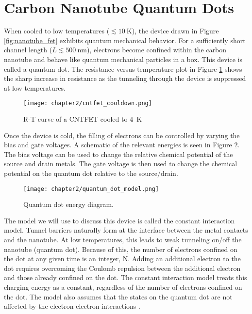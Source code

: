 \section{Carbon Nanotube Quantum Dots}
\label{sec:constant_interaction_model}

When cooled to low temperatures ($\lesssim \SI{10}{\kelvin}$), the device drawn in Figure \ref{fig:nanotube_fet} exhibits quantum mechanical behavior. For a sufficiently short channel length ($L \lesssim \SI{500}{\nano\meter}$), electrons become confined within the carbon nanotube and behave like quantum mechanical particles in a box. This device is called a quantum dot. The resistance versus temperature plot in Figure \ref{fig:CNT_RT} shows the sharp increase in resistance as the tunneling through the device is suppressed at low temperatures. 

\begin{figure}
    \centering
    \texttt{[image: chapter2/cntfet\_cooldown.png]}
    \caption{R-T curve of a CNTFET cooled to \SI{4}{\kelvin}}
    \label{fig:CNT_RT}
\end{figure}

Once the device is cold, the filling of electrons can be controlled by varying the bias and gate voltages. A schematic of the relevant energies is seen in Figure \ref{fig:QD_model}. The bias voltage can be used to change the relative chemical potential of the source and drain metals. The gate voltage is then used to change the chemical potential on the quantum dot relative to the source/drain.

\begin{figure}
    \centering
    \texttt{[image: chapter2/quantum\_dot\_model.png]}
    \caption{Quantum dot energy diagram.}
    \label{fig:QD_model}
\end{figure}

The model we will use to discuss this device is called the constant interaction model. Tunnel barriers naturally form at the interface between the metal contacts and the nanotube. At low temperatures, this leads to weak tunneling on/off the nanotube (quantum dot). Because of this, the number of electrons confined on the dot at any given time is an integer, N. Adding an additional electron to the dot requires overcoming the Coulomb repulsion between the additional electron and those already confined on the dot. The constant interaction model treats this charging energy as a constant, regardless of the number of electrons confined on the dot. The model also assumes that the states on the quantum dot are not affected by the electron-electron interactions \cite{Kouwenhoven2001}.

